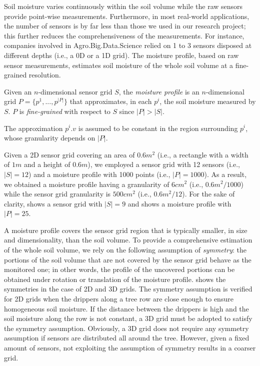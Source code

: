 Soil moisture varies continuously within the soil volume while the raw sensors provide point-wise measurements. 
Furthermore, in most real-world applications, the number of sensors is by far less than those we used in our research project; this further reduces the comprehensiveness of the measurements.
For instance, companies involved in Agro.Big.Data.Science \cite{ABDS} relied on 1 to 3 sensors disposed at different depths (i.e., a 0D or a 1D grid).
The moisture profile, based on raw sensor measurements, estimates soil moisture of the whole soil volume at a fine-grained resolution.

\begin{definition}
Given an $n$-dimensional sensor grid $S$, the \emph{moisture profile} is an $n$-dimensional grid $P = \{p^1, ..., p^{|P|}\}$ that approximates, in each $p^i$, the soil moisture measured by $S$. $P$ is \emph{fine-grained} with respect to $S$ since $|P| > |S|$. 
\end{definition}

The approximation $p^i.v$ is assumed to be constant in the region surrounding $p^i$, whose granularity depends on $|P|$.

\begin{example}
Given a 2D sensor grid covering an area of $0.6 m^2$ (i.e., a rectangle with a width of $1m$ and a height of $0.6m$), we employed a sensor grid with 12 sensors (i.e., $|S| = 12$) and a moisture profile with 1000 points (i.e., $|P| = 1000$). As a result, we obtained a moisture profile having a granularity of $6 cm^2$ (i.e., $0.6 m^2 / 1000$) while the sensor grid granularity is $500cm^2$ (i.e., $0.6 m^2 / 12$). For the sake of clarity,  shows a sensor grid with $|S|=9$ and  shows a moisture profile with $|P|=25$.
\end{example}

A moisture profile covers the sensor grid region that is typically smaller, in size and dimensionality, than the soil volume. To provide a comprehensive estimation of the whole soil volume, we rely on the following assumption of \emph{symmetry}: the portions of the soil volume that are not covered by the sensor grid behave as the monitored one; in other words, the profile of the uncovered portions can be obtained under rotation or translation of the moisture profile.
 shows the symmetries in the case of 2D and 3D grids.
The symmetry assumption is verified for 2D grids when the drippers along a tree row are close enough to ensure homogeneous soil moisture.
If the distance between the drippers is high and the soil moisture along the row is not constant, a 3D grid must be adopted to satisfy the symmetry assumption.
Obviously, a 3D grid does not require any symmetry assumption if sensors are distributed all around the tree.
However, given a fixed amount of sensors, not exploiting the assumption of symmetry results in a coarser grid. 

